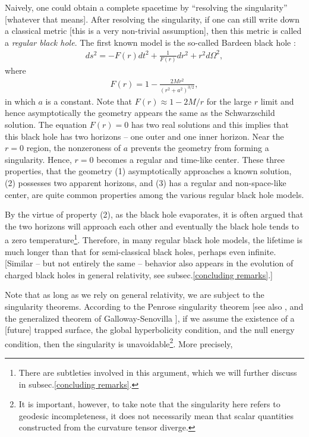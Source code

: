 \documentclass[12pt]{article}
\newcommand{\2}{$^2$}
\newcommand{\3}{$^3$}
\newcommand{\4}{$_4$}
\newcommand{\5}{$_5$}
\begin{document}
Naively, one could obtain a complete spacetime by ``resolving the singularity'' [whatever that means]. After resolving the singularity, if one can still write down a classical metric [this is a very non-trivial assumption], then this metric is called a \emph{regular black hole}. The first known model is the so-called Bardeen black hole \cite{Bardeen}:
\begin{eqnarray}
ds^{2} = - F(r) dt^{2} + \frac{1}{F(r)} dr^{2} + r^{2} d\Omega^{2},
\end{eqnarray}
where
\begin{eqnarray}
F(r) = 1 - \frac{2Mr^{2}}{(r^{2} + a^{2})^{3/2}},
\end{eqnarray}
in which $a$ is a constant. 
Note that $F(r) \approx 1 - 2M/r$ for the large $r$ limit and hence asymptotically the geometry appears the same as the Schwarzschild solution. The equation $F(r) = 0$ has two real solutions and this implies that this black hole has two horizons -- one outer and one inner horizon. Near the $r = 0$ region, the nonzeroness of $a$ prevents the geometry  from forming a singularity. Hence, $r=0$ becomes a regular and time-like center. These three properties, that the geometry (1) asymptotically approaches a known solution, (2) possesses two apparent horizons, and (3) has a regular and non-space-like center, are quite common properties among the various regular black hole models. 

By the virtue of  property (2), as the black hole evaporates, it is often argued that the two horizons will approach each other and eventually the black hole tends to a zero temperature\footnote{There are subtleties involved in this argument, which we will further discuss in subsec.\ref{concluding remarks}.}. Therefore, in many regular black hole models, the lifetime is much longer than that for semi-classical black holes, perhaps even infinite. [Similar -- but not entirely the same -- behavior also appears in the evolution of charged black holes in general relativity, see subsec.\ref{concluding remarks}.]

Note that as long as we rely on general relativity, we are subject to the singularity theorems. According to the Penrose singularity theorem \cite{P} [see also \cite{HE}, and the generalized theorem of Galloway-Senovilla \cite{GS}], if we assume the existence of a [future] trapped surface, the global hyperbolicity condition, and the null energy condition, then the singularity is unavoidable\footnote{It is important, however, to take note that the singularity here refers to geodesic incompleteness, it does not necessarily mean that scalar quantities constructed from the curvature tensor diverge.}. More precisely, 
\end{document}
